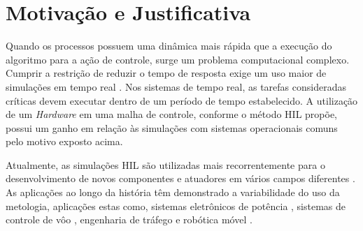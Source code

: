 \section{Motivação e Justificativa}

Quando os processos possuem uma dinâmica mais rápida que a execução do algoritmo para a ação 
de controle, surge um problema computacional complexo. Cumprir a restrição de reduzir o tempo
de resposta exige um uso maior de simulações em tempo real \cite{Isermann}. Nos sistemas de 
tempo real, as tarefas consideradas críticas devem executar dentro de um período de tempo 
estabelecido. A utilização de um \textit{Hardware} em uma malha de controle, conforme o 
método HIL propõe, possui um ganho em relação às simulações com 
sistemas operacionais comuns pelo motivo exposto acima.

Atualmente, as simulações HIL são utilizadas mais recorrentemente
para o desenvolvimento de novos componentes e atuadores em vários campos
diferentes \cite{Bouscayrol}. As aplicações ao longo da história têm demonstrado a 
variabilidade do uso da metologia, aplicações estas como, sistemas eletrônicos de 
potência \cite{Rothstein}, sistemas de controle de vôo \cite{Karpenko}, engenharia 
de tráfego \cite{Bullock} e robótica móvel \cite{Kamali}.




